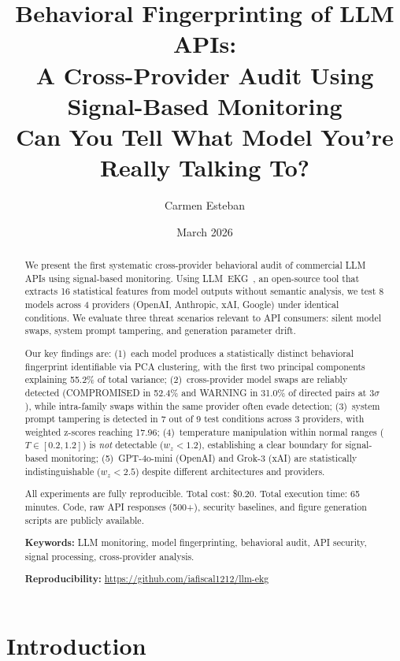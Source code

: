 \documentclass[11pt,twocolumn]{article}
\title{%
\textbf{Behavioral Fingerprinting of LLM APIs:\\
A Cross-Provider Audit Using Signal-Based Monitoring}\\[6pt]
\large Can You Tell What Model You're Really Talking To?%
}
\author[1]{Carmen Esteban}
\affil[1]{IAFISCAL \& PARTNERS, Madrid, Spain\\
\texttt{caresment@gmail.com}}
\date{March 2026}
\begin{document}
\maketitle

\begin{abstract}
We present the first systematic cross-provider behavioral audit of commercial LLM APIs using signal-based monitoring.
Using LLM~EKG~\cite{esteban2026llmekg}, an open-source tool that extracts 16 statistical features from model outputs without semantic analysis, we test 8 models across 4 providers (OpenAI, Anthropic, xAI, Google) under identical conditions.
We evaluate three threat scenarios relevant to API consumers: silent model swaps, system prompt tampering, and generation parameter drift.

Our key findings are:
(1)~each model produces a statistically distinct behavioral fingerprint identifiable via PCA clustering, with the first two principal components explaining 55.2\% of total variance;
(2)~cross-provider model swaps are reliably detected (COMPROMISED in 52.4\% and WARNING in 31.0\% of directed pairs at $3\sigma$), while intra-family swaps within the same provider often evade detection;
(3)~system prompt tampering is detected in 7 out of 9 test conditions across 3 providers, with weighted z-scores reaching 17.96;
(4)~temperature manipulation within normal ranges ($T \in [0.2, 1.2]$) is \emph{not} detectable ($w_z < 1.2$), establishing a clear boundary for signal-based monitoring;
(5)~GPT-4o-mini (OpenAI) and Grok-3 (xAI) are statistically indistinguishable ($w_z < 2.5$) despite different architectures and providers.

All experiments are fully reproducible.
Total cost: \$0.20.
Total execution time: 65 minutes.
Code, raw API responses (500+), security baselines, and figure generation scripts are publicly available.

\medskip
\noindent\textbf{Keywords:} LLM monitoring, model fingerprinting, behavioral audit, API security, signal processing, cross-provider analysis.

\medskip
\noindent\textbf{Reproducibility:} \url{https://github.com/iafiscal1212/llm-ekg}
\end{abstract}

\section{Introduction}
\label{sec:intro}
\end{document}
